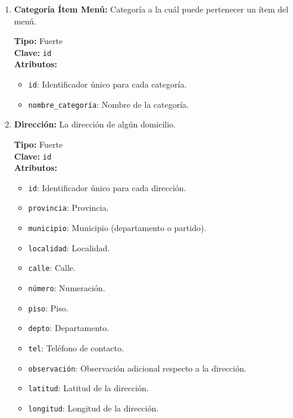 \begin{enumerate}
    \item \textbf{Categoría Ítem Menú:} Categoría a la cuál puede pertenecer un ítem del menú.
    
    \textbf{Tipo:} Fuerte \\
    \textbf{Clave:} \texttt{id} \\
    \textbf{Atributos:}
    \begin{itemize}
        \item \texttt{id}: Identificador único para cada categoría.
        \item \texttt{nombre\_categoría}: Nombre de la categoría.
    \end{itemize}
    
    \item \textbf{Dirección:} La dirección de algún domicilio.
    
    \textbf{Tipo:} Fuerte \\
    \textbf{Clave:} \texttt{id} \\
    \textbf{Atributos:}
    \begin{itemize}
        \item \texttt{id}: Identificador único para cada dirección.
        \item \texttt{provincia}: Provincia.
        \item \texttt{municipio}: Municipio (departamento o partido).
        \item \texttt{localidad}: Localidad.
        \item \texttt{calle}: Calle.
        \item \texttt{número}: Numeración.
        \item \texttt{piso}: Piso.
        \item \texttt{depto}: Departamento.
        \item \texttt{tel}: Teléfono de contacto.
        \item \texttt{observación}: Observación adicional respecto a la dirección.
        \item \texttt{latitud}: Latitud de la dirección.
        \item \texttt{longitud}: Longitud de la dirección.
    \end{itemize}
    

\end{enumerate}

